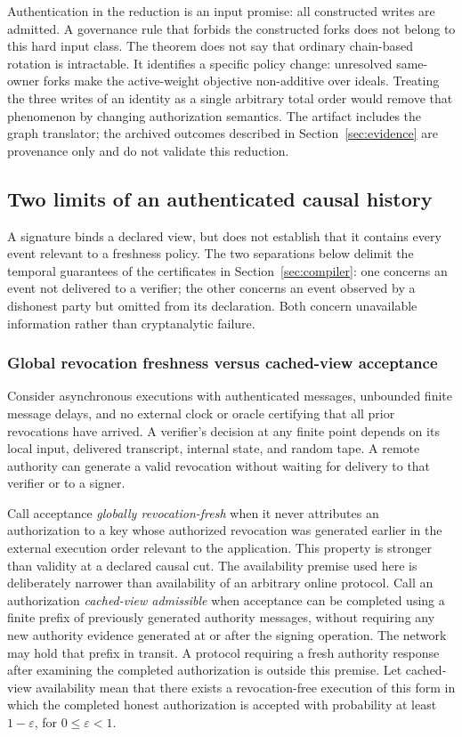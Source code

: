\documentclass[11pt]{article}
\theoremstyle{definition}
\begin{document}
Authentication in the reduction is an input promise: all constructed writes are admitted. A governance rule that forbids the constructed forks does not belong to this hard input class. The theorem does not say that ordinary chain-based rotation is intractable. It identifies a specific policy change: unresolved same-owner forks make the active-weight objective non-additive over ideals. Treating the three writes of an identity as a single arbitrary total order would remove that phenomenon by changing authorization semantics. The artifact includes the graph translator; the archived outcomes described in Section~\ref{sec:evidence} are provenance only and do not validate this reduction.


\subsection{Two limits of an authenticated causal history}\label{sec:observations}
A signature binds a declared view, but does not establish that it contains every event relevant to a freshness policy. The two separations below delimit the temporal guarantees of the certificates in Section~\ref{sec:compiler}: one concerns an event not delivered to a verifier; the other concerns an event observed by a dishonest party but omitted from its declaration. Both concern unavailable information rather than cryptanalytic failure.

\subsubsection{Global revocation freshness versus cached-view acceptance}
Consider asynchronous executions with authenticated messages, unbounded finite message delays, and no external clock or oracle certifying that all prior revocations have arrived. A verifier's decision at any finite point depends on its local input, delivered transcript, internal state, and random tape. A remote authority can generate a valid revocation without waiting for delivery to that verifier or to a signer.

Call acceptance \emph{globally revocation-fresh} when it never attributes an authorization to a key whose authorized revocation was generated earlier in the external execution order relevant to the application. This property is stronger than validity at a declared causal cut. The availability premise used here is deliberately narrower than availability of an arbitrary online protocol. Call an authorization \emph{cached-view admissible} when acceptance can be completed using a finite prefix of previously generated authority messages, without requiring any new authority evidence generated at or after the signing operation. The network may hold that prefix in transit. A protocol requiring a fresh authority response after examining the completed authorization is outside this premise. Let cached-view availability mean that there exists a revocation-free execution of this form in which the completed honest authorization is accepted with probability at least $1-\varepsilon$, for $0\leq\varepsilon<1$.
\end{document}
